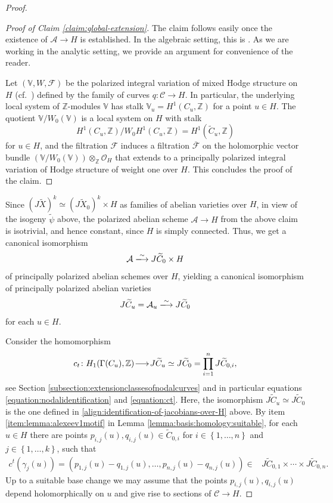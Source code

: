 \documentclass[a4paper,11pt,reqno]{amsart}
\makeatletter
\numberwithin{equation}{section}
\theoremstyle{plain}
\theoremstyle{definition}
\newcommand{\Z}{\mathbb Z}
\newcommand{\OO}{\mathcal O}
\newcommand{\bb}[1]{{\mathbb{#1}}}
\newcommand{\ca}[1]{{\mathcal{#1}}}
\newcommand{\wt}[1]{{\widetilde{#1}}}
\renewcommand{\longrightarrow}{\xymatrix@1@=15pt{\ar[r]&}}
\renewcommand{\cong}{\simeq}
\newcommand{\set}[1]{\left\{ #1 \right\}}
\makeatother
\begin{document}
\begin{proof}
\begin{proof}[Proof of Claim \ref{claim:global-extension}]
The claim follows easily once the existence of $\ca A \to H$ is established. 
In the algebraic setting, this is \cite[Chapter I, Corollary 2.11]{faltings-chai}. As we are working in the analytic setting, we provide an argument for convenience of the reader. 

Let $(\bb V, W, \ca F)$ be the polarized integral variation of mixed Hodge structure on $H$ (cf.\ \cite[Definitions 14.44 \& 14.45]{petersteenbrink}) defined by the family of curves $q \colon \ca C \to H$. In particular, the underlying local system of $\Z$-modules $\bb V$ has stalk $\bb V_{u} = H^1(C_u,\Z)$ for a point $u \in H$. The quotient $\bb V/W_0(\bb V)$ is a local system on $H$ with stalk $$H^1(C_u,\Z)/W_0H^1(C_u,\Z) = H^1(\wt C_u,\Z)$$ for $u \in H$, and the filtration $\ca F$ induces a filtration $\overline{\ca F}$ on the holomorphic vector bundle $\left(\bb V/W_0(\bb V) \right) \otimes_{\Z} \OO_H$ that extends to a principally polarized integral variation of Hodge structure of weight one over $H$. 
This concludes the proof of the claim.
\end{proof}

Since $(J \wt X)^k \cong (J \wt X_0)^k \times H$ as families of abelian varieties over $H$, in view of the isogeny $\wt \psi$ above, the polarized abelian scheme $\ca A \to H$ from the above claim is isotrivial, and hence constant, since $H$ is simply connected. Thus, we get a canonical isomorphism
$$
\ca A \xlongrightarrow{\sim} J \wt C_0 \times H
$$
of principally polarized abelian schemes over $H$, yielding a canonical isomorphism of principally polarized abelian varieties
\begin{align} \label{align:identification-of-jacobians-over-H}
J \wt C_u = \ca A_u \xlongrightarrow{\sim} J \wt C_0
\end{align}
for each $u \in H$. 

Consider the homomorphism 
\[
c_t \colon H_1(\Gamma(C_u),\Z) \longrightarrow J \wt C_u \cong J \wt C_0 = \prod_{i = 1}^n J \wt C_{0,i},
\]
see Section \ref{subsection:extensionclassesofnodalcurves} and in particular equations \eqref{equation:nodalidentification} and \eqref{equation:ct}. 
Here, the isomorphism $J \wt C_u \cong J \wt C_0$ is the one defined in \eqref{align:identification-of-jacobians-over-H} above.
By item \eqref{item:lemma:alexeev1motif} in Lemma \ref{lemma:basis:homology:suitable}, for each $u\in H$ there are points $p_{i,j}(u), q_{i,j}(u) \in \wt C_{0,i}$ for $i \in \set{1, \dotsc, n}$ and $j \in \set{1, \dotsc, k}$, such that
\begin{align} \label{equation:extensionclasC0}
c^t(\gamma_j(u)) = \left(p_{1,j}(u) - q_{1,j}(u), \dotsc, p_{n,j}(u) - q_{n,j}(u)\right) \in & J \wt C_{0,1} \times \cdots \times J \wt C_{0,n}.
\end{align}  
Up to a suitable base change we may assume that the points $p_{i,j}(u),q_{i,j}(u)$ depend holomorphically on $u$ and give rise to sections of $\mathcal C\to H$. 


\end{proof}
\end{document}
